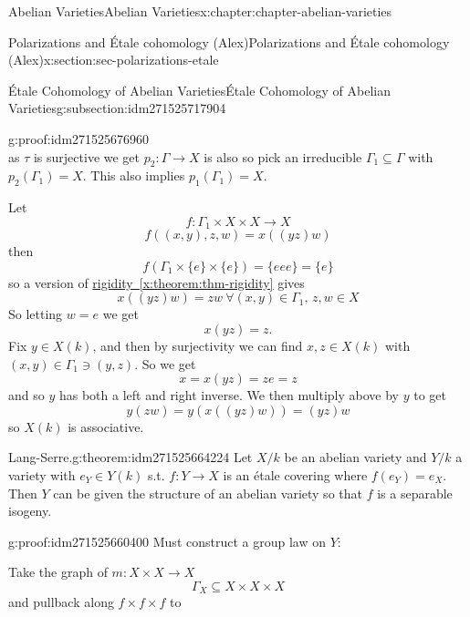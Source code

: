 \documentclass[oneside,10pt,]{book}
\numberwithin{equation}{section}
\begin{document}
\begin{chapterptx}{Abelian Varieties}{}{Abelian Varieties}{}{}{x:chapter:chapter-abelian-varieties}
\begin{sectionptx}{Polarizations and Étale cohomology (Alex)}{}{Polarizations and Étale cohomology (Alex)}{}{}{x:section:sec-polarizations-etale}
\begin{subsectionptx}{Étale Cohomology of Abelian Varieties}{}{Étale Cohomology of Abelian Varieties}{}{}{g:subsection:idm271525717904}
\begin{proofptx}{}{g:proof:idm271525676960}
\begin{equation*}
\end{equation*}
as \(\tau \) is surjective we get \(p_2 \colon \Gamma \to X\) is also so pick an irreducible \(\Gamma_1 \subseteq \Gamma\) with \(p_2(\Gamma_1) = X\). This also implies \(p_1(\Gamma_1) = X\).%
\par
Let%
\begin{equation*}
f\colon \Gamma_1 \times X\times X \to X
\end{equation*}
%
\begin{equation*}
f((x,y),z,w) = x((yz)w)
\end{equation*}
then%
\begin{equation*}
f(\Gamma_1 \times\{e\}\times\{e\}) = \{eee\} = \{e\}
\end{equation*}
so a version of \hyperref[x:theorem:thm-rigidity]{rigidity~\ref{x:theorem:thm-rigidity}} gives%
\begin{equation*}
x((yz)w) = zw\ \forall (x,y) \in \Gamma_1,\,z,w\in X
\end{equation*}
So letting \(w = e\) we get%
\begin{equation*}
x(yz) = z\text{.}
\end{equation*}
Fix \(y \in X(k)\), and then by surjectivity we can find \(x,z \in X(k)\) with \((x,y)\in \Gamma_1 \ni (y,z)\). So we get%
\begin{equation*}
x = x(yz) = ze = z
\end{equation*}
and so \(y\) has both a left and right inverse. We then multiply above by \(y\) to get%
\begin{equation*}
y(zw) = y(x((yz)w)) = (yz)w
\end{equation*}
so \(X(k)\) is associative.%
\end{proofptx}
\begin{theorem}{Lang-Serre.}{}{g:theorem:idm271525664224}%
Let \(X/k\) be an abelian variety and \(Y/k\) a variety with \(e_Y\in Y(k)\) s.t. \(f\colon Y \to X\) is an étale covering where \(f(e_Y) = e_X\). Then \(Y\) can be given the structure of an abelian variety so that \(f\) is a separable isogeny.%
\end{theorem}
\begin{proofptx}{}{g:proof:idm271525660400}
Must construct a group law on \(Y\):%
\par
Take the graph of \(m\colon X\times X \to X\)%
\begin{equation*}
\Gamma_X \subseteq X\times X\times X
\end{equation*}
and pullback along \(f\times f\times f\) to%
\begin{equation*}

\end{equation*}
\end{proofptx}
\end{subsectionptx}
\end{sectionptx}
\end{chapterptx}
\end{document}
